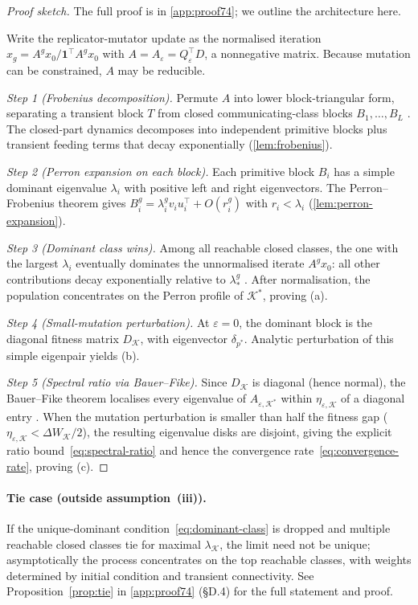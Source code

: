 \documentclass[12pt]{article}
\begin{document}
\begin{proof}[Proof sketch]
The full proof is in \cref{app:proof74}; we outline the architecture here.

Write the replicator-mutator update as the normalised iteration $x_g = A^g x_0 / \mathbf{1}^\top A^g x_0$ with $A = A_\varepsilon = Q_\varepsilon^\top D$, a nonnegative matrix. Because mutation can be constrained, $A$ may be reducible.

\emph{Step 1 (Frobenius decomposition).} Permute $A$ into lower block-triangular form, separating a transient block $T$ from closed communicating-class blocks $B_1, \ldots, B_L$ \citep{seneta_2006}. The closed-part dynamics decomposes into independent primitive blocks plus transient feeding terms that decay exponentially (\cref{lem:frobenius}).

\emph{Step 2 (Perron expansion on each block).} Each primitive block $B_i$ has a simple dominant eigenvalue $\lambda_i$ with positive left and right eigenvectors. The Perron--Frobenius theorem gives $B_i^g = \lambda_i^g v_i u_i^\top + O(r_i^g)$ with $r_i < \lambda_i$ \citep{seneta_2006} (\cref{lem:perron-expansion}).

\emph{Step 3 (Dominant class wins).} Among all reachable closed classes, the one with the largest $\lambda_i$ eventually dominates the unnormalised iterate $A^g x_0$: all other contributions decay exponentially relative to $\lambda_*^g$ \citep{seneta_2006}. After normalisation, the population concentrates on the Perron profile of $\mathcal{K}^*$, proving (a).

\emph{Step 4 (Small-mutation perturbation).} At $\varepsilon = 0$, the dominant block is the diagonal fitness matrix $D_\mathcal{K}$, with eigenvector $\delta_{p^*}$. Analytic perturbation of this simple eigenpair \citep{kato_1995,greenbaum_etal_2020} yields (b).

\emph{Step 5 (Spectral ratio via Bauer--Fike).} Since $D_\mathcal{K}$ is diagonal (hence normal), the Bauer--Fike theorem localises every eigenvalue of $A_{\varepsilon,\mathcal{K}^*}$ within $\eta_{\varepsilon,\mathcal{K}}$ of a diagonal entry \citep{greenbaum_etal_2020}. When the mutation perturbation is smaller than half the fitness gap ($\eta_{\varepsilon,\mathcal{K}} < \Delta W_\mathcal{K}/2$), the resulting eigenvalue disks are disjoint, giving the explicit ratio bound~\eqref{eq:spectral-ratio} and hence the convergence rate~\eqref{eq:convergence-rate}, proving (c).
\end{proof}

\paragraph{Tie case (outside assumption~(iii)).}
If the unique-dominant condition~\eqref{eq:dominant-class} is dropped and multiple reachable closed classes tie for maximal $\lambda_\mathcal{K}$, the limit need not be unique; asymptotically the process concentrates on the top reachable classes, with weights determined by initial condition and transient connectivity. See Proposition~\ref{prop:tie} in \cref{app:proof74} (\S D.4) for the full statement and proof.
\end{document}
